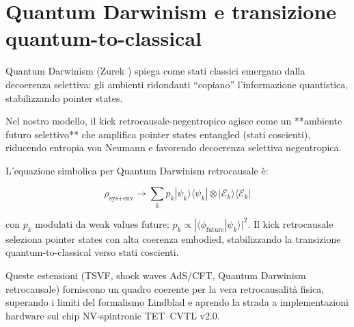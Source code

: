 \documentclass[11pt,a4paper]{article}
\let\oldcite\cite
\renewcommand{\cite}{\protect\oldcite}
\theoremstyle{plain}
\theoremstyle{definition}
\begin{document}
\vspace{0.5cm}





\section{Quantum Darwinism e transizione quantum-to-classical}

Quantum Darwinism (Zurek \cite{zurek_quantum_2003}) spiega come stati classici emergano dalla decoerenza selettiva: gli ambienti ridondanti “copiano” l'informazione quantistica, stabilizzando pointer states. 


\vspace{0.3cm}


Nel nostro modello, il kick retrocausale-negentropico agisce come un **ambiente futuro selettivo** che amplifica pointer states entangled (stati coscienti), riducendo entropia von Neumann e favorendo decoerenza selettiva negentropica.

\vspace{0.3cm}

L'equazione simbolica per Quantum Darwinism retrocausale è:

\vspace{0.2cm}

\begin{equation}
\rho_{\text{sys+env}} \to \sum_k p_k |\psi_k\rangle\langle \psi_k| \otimes |\mathcal{E}_k\rangle\langle \mathcal{E}_k|
\label{eq:darwinism}
\end{equation}

\vspace{0.2cm}

con $p_k$ modulati da weak values future: $p_k \propto |\langle \phi_{\text{future}} | \psi_k \rangle|^2$. Il kick retrocausale seleziona pointer states con alta coerenza embodied, stabilizzando la transizione quantum-to-classical verso stati coscienti.


\vspace{0.4cm}

Queste estensioni (TSVF, shock waves AdS/CFT, Quantum Darwinism retrocausale) forniscono un quadro coerente per la vera retrocausalità fisica, superando i limiti del formalismo Lindblad e aprendo la strada a implementazioni hardware sul chip NV-spintronic TET–CVTL v2.0.





\vspace{0.5cm}
\end{document}
